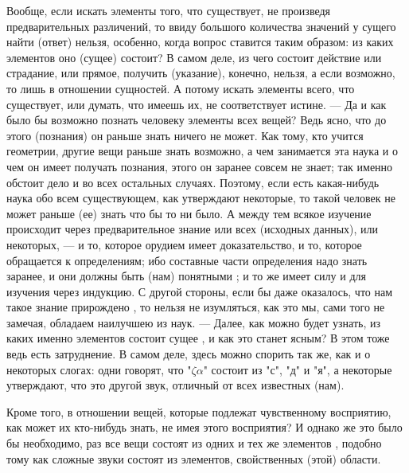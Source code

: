 \documentclass{article}
\begin{document}
Вообще, если искать элементы того, что существует, не произведя предварительных различений, то ввиду большого количества значений у сущего
\footnotemark[52]
найти (ответ) нельзя, особенно, когда вопрос ставится таким образом: из каких элементов оно (сущее) состоит? В самом деле, из чего состоит действие или страдание, или прямое, получить (указание), конечно, нельзя, а если возможно, то лишь в отношении сущностей.  А потому искать элементы всего, что существует, или думать, что имеешь их, не соответствует истине. — Да и как было бы возможно познать человеку элементы всех вещей? Ведь ясно, что до этого (познания) он раньше знать ничего не может.
\footnotemark[53]
Как тому, кто учится геометрии, другие вещи раньше знать возможно, а чем занимается эта наука и о чем он имеет получать познания, этого он заранее совсем не знает; так именно обстоит дело и во всех остальных случаях. Поэтому, если есть какая-нибудь наука обо всем существующем, как утверждают некоторые, то такой человек не может раньше (ее) знать что бы то ни было. А между тем всякое изучение происходит через предварительное знание или всех (исходных данных), или некоторых, — и то, которое орудием имеет доказательство, и то, которое обращается к определениям; ибо составные части определения надо знать заранее, и они должны быть (нам) понятными
\footnotemark[54]
; и то же имеет силу и для изучения через индукцию. С другой стороны, если бы даже оказалось, что нам такое знание прирождено
\footnotemark[55]
, то нельзя не изумляться, как это мы, сами того не замечая, обладаем наилучшею из наук. — Далее, как можно будет узнать, из каких именно элементов состоит сущее
\footnotemark[56]
, и как это станет ясным? В этом тоже ведь есть затруднение. В самом деле, здесь можно спорить так же, как и о некоторых слогах: одни говорят, что "$\zeta \alpha$" состоит из "с", "д" и "я", а некоторые утверждают, что это другой звук, отличный от всех известных (нам).
\footnotemark[57]

Кроме того, в отношении вещей, которые подлежат чувственному восприятию, как может их кто-нибудь знать, не имея этого восприятия? И однако же это было бы необходимо, раз все вещи состоят из одних и тех же элементов
\footnotemark[58]
, подобно тому как сложные звуки состоят из элементов, свойственных (этой) области.
\end{document}
